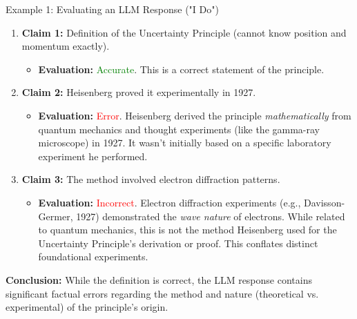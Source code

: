 \documentclass{beamer}
\begin{document}
\begin{frame}{Example 1: Evaluating an LLM Response ("I Do")}
        \begin{enumerate}
            \item \textbf{Claim 1:} Definition of the Uncertainty Principle (cannot know position and momentum exactly).
                \begin{itemize}
                    \item \textbf{Evaluation:} \textcolor{green}{Accurate}. This is a correct statement of the principle.
                \end{itemize}
            \pause
            \item \textbf{Claim 2:} Heisenberg proved it experimentally in 1927.
                \begin{itemize}
                    \item \textbf{Evaluation:} \textcolor{red}{Error}. Heisenberg derived the principle \emph{mathematically} from quantum mechanics and thought experiments (like the gamma-ray microscope) in 1927. It wasn't initially based on a specific laboratory experiment he performed. 
                \end{itemize}
                \pause
            \item \textbf{Claim 3:} The method involved electron diffraction patterns.
                \begin{itemize}
                    \item \textbf{Evaluation:} \textcolor{red}{Incorrect}. Electron diffraction experiments (e.g., Davisson-Germer, 1927) demonstrated the \emph{wave nature} of electrons. While related to quantum mechanics, this is not the method Heisenberg used for the Uncertainty Principle's derivation or proof. This conflates distinct foundational experiments.
                \end{itemize}
        \end{enumerate}
        \pause
        \textbf{Conclusion:} While the definition is correct, the LLM response contains significant factual errors regarding the method and nature (theoretical vs. experimental) of the principle's origin.
\end{frame}
\end{document}

